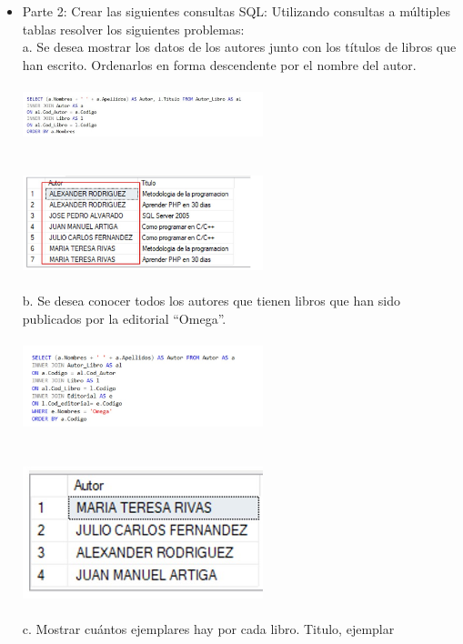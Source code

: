 \documentclass[preprint,12pt]{elsarticle}
\begin{document}
\begin{itemize}
		\\ \item Parte 2: Crear las siguientes consultas SQL:
		Utilizando consultas a múltiples tablas resolver los siguientes problemas:
		\\ a. Se desea mostrar los datos de los autores junto con los títulos de libros que han escrito.
		Ordenarlos en forma descendente por el nombre del autor.
		\\
		\\ \includegraphics[width=7cm]{./IMAGENES/2.1} \\
		\\
		\\ \includegraphics[width=7cm]{./IMAGENES/2.1.1} \\
		\\ b. Se desea conocer todos los autores que tienen libros que han sido publicados por la
		editorial “Omega”.
		\\
		\\ \includegraphics[width=7cm]{./IMAGENES/2.2} \\
		\\
		\\ \includegraphics[width=7cm]{./IMAGENES/2.2.1} \\
		\\ c. Mostrar cuántos ejemplares hay por cada libro. Titulo, ejemplar
		\\

\end{itemize}
\end{document}
